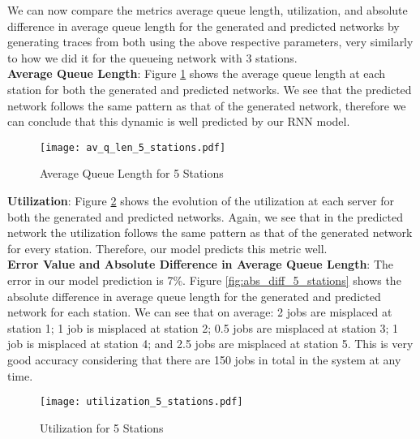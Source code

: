\documentclass[a4paper,11pt,titlepage]{article}
\begin{document}
We can now compare the metrics average queue length, utilization, and absolute difference in average queue length for the generated and predicted networks by generating traces from both using the above respective parameters, very similarly to how we did it for the queueing network with 3 stations. \\ 

\textbf{Average Queue Length}: Figure \ref{fig:av_q_length_5_stations} shows the average queue length at each station for both the generated and predicted networks. We see that the predicted network follows the same pattern as that of the generated network, therefore we can conclude that this dynamic is well predicted by our RNN model. \\

\begin{figure}[h!]
\begin{center}
\texttt{[image: av\_q\_len\_5\_stations.pdf]}
\caption{Average Queue Length for 5 Stations}
\label{fig:av_q_length_5_stations}
\end{center}
\end{figure}

\textbf{Utilization}: Figure \ref{fig:utilization_5_stations} shows the evolution of the utilization at each server for both the generated and predicted networks. Again, we see that in the predicted network the utilization follows the same pattern as that of the generated network for every station. Therefore, our model predicts this metric well. \\

\textbf{Error Value and Absolute Difference in Average Queue Length}: The error in our model prediction is 7\%. Figure \ref{fig:abs_diff_5_stations} shows the absolute difference in average queue length for the generated and predicted network for each station. We can see that on average: 2 jobs are misplaced at station 1; 1 job is misplaced at station 2; 0.5 jobs are misplaced at station 3; 1 job is misplaced at station 4; and 2.5 jobs are misplaced at station 5. This is very good accuracy considering that there are 150 jobs in total in the system at any time. 

\begin{figure}[h!]
\begin{center}
\texttt{[image: utilization\_5\_stations.pdf]}
\caption{Utilization for 5 Stations}
\label{fig:utilization_5_stations}
\end{center}
\end{figure}
\end{document}
